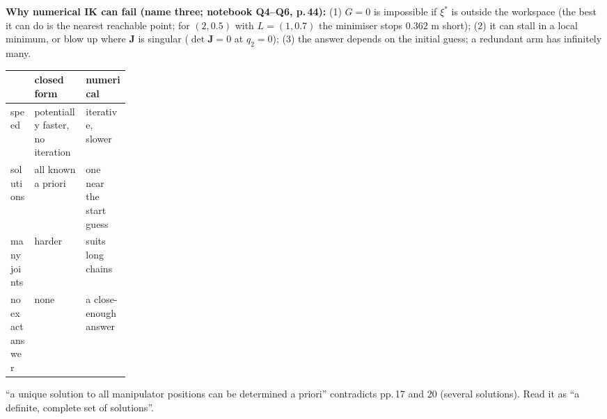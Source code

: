 \begin{multicols}{2}
\textbf{Why numerical IK can fail (name three; notebook Q4--Q6, p.\,44):} (1) $G=0$ is impossible if $\xi^*$ is outside the workspace (the best it can do is the nearest reachable point; for $(2,0.5)$ with $L=(1,0.7)$ the minimiser stops $0.362$ m short); (2) it can stall in a local minimum, or blow up where $\mathbf J$ is singular ($\det\mathbf J=0$ at $q_2=0$); (3) the answer depends on the initial guess; a redundant arm has infinitely many. \chk
\begin{fbx}
\begin{tabularx}{\linewidth}{@{}>{\raggedright\arraybackslash}p{0.2\linewidth}>{\raggedright\arraybackslash}X>{\raggedright\arraybackslash}X@{}}
\toprule & closed form & numerical\\\midrule
speed & potentially faster, no iteration & iterative, slower\\
solutions & all known a priori & one near the start guess\\
many joints & harder & suits long chains\\
no exact answer & none & a close-enough answer\\
\bottomrule
\end{tabularx}
\end{fbx}
\begin{slideerr}[p.\,54]
``a unique solution to all manipulator positions can be determined a priori'' contradicts pp.\,17 and 20 (several solutions). Read it as ``a definite, complete set of solutions''.
\end{slideerr}


\end{multicols}
